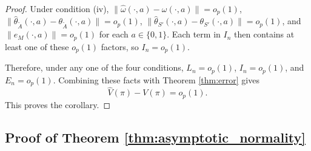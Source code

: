 \documentclass[12pt]{article}
\newcommand{\0}{\boldsymbol{0}}
\begin{document}
\begin{proof}
Under condition (iv), $\|\widehat\omega(\cdot,a)-\omega(\cdot,a)\| =o_p(1)$, $\|\widehat\theta_{\widetilde A}(\cdot,a) -\theta_{\widetilde A}(\cdot,a)\|=o_p(1)$,
$\|\widehat\theta_{S'}(\cdot,a)-\theta_{S'}(\cdot,a)\|=o_p(1)$, and $\|e_M(\cdot,a)\|=o_p(1)$ for each $a\in\{0,1\}$. Each term in $I_n$ then contains at least one of these $o_p(1)$ factors, so $I_n=o_p(1)$.

Therefore, under any one of the four conditions, $L_n=o_p(1)$, $I_n=o_p(1)$, and $E_n=o_p(1)$. Combining these facts with Theorem \ref{thm:error} gives
\[
\widehat V(\pi)-V(\pi)=o_p(1).
\]
This proves the corollary.
\end{proof}

\subsection{Proof of Theorem \ref{thm:asymptotic_normality}}
\end{document}
